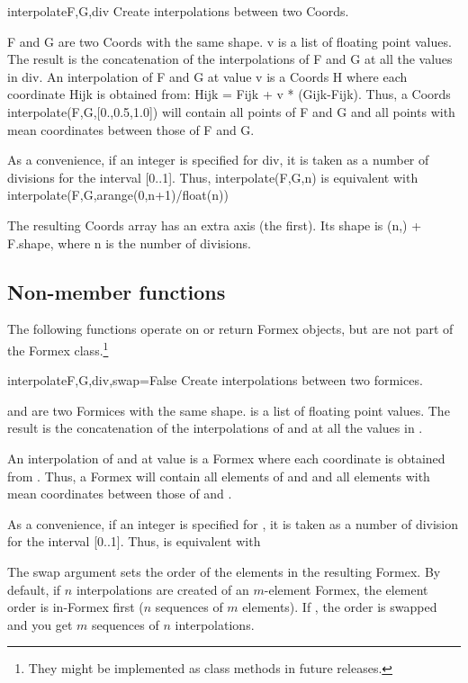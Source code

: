 \begin{methoddesc}{interpolate}{F,G,div}
Create interpolations between two Coords.

        F and G are two Coords with the same shape.
        v is a list of floating point values.
        The result is the concatenation of the interpolations of F and G at all
        the values in div.
        An interpolation of F and G at value v is a Coords H where each
        coordinate Hijk is obtained from:  Hijk = Fijk + v * (Gijk-Fijk).
        Thus, a Coords interpolate(F,G,[0.,0.5,1.0]) will contain all points of
        F and G and all points with mean coordinates between those of F and G.

        As a convenience, if an integer is specified for div, it is taken as a
        number of divisions for the interval [0..1].
        Thus, interpolate(F,G,n) is equivalent with
        interpolate(F,G,arange(0,n+1)/float(n))

        The resulting Coords array has an extra axis (the first). Its shape is
        (n,) + F.shape, where n is the number of divisions.

\classmethod
\end{methoddesc}



\subsection{Non-member functions}
The following functions operate on or return Formex objects, but are not part of the Formex class.\footnote{They might be implemented as class methods in future releases.}


\begin{funcdesc}{interpolate}{F,G,div,swap=False}
Create interpolations between two formices.

 and  are two Formices with the same shape.
 is a list of floating point values.
The result is the concatenation of the interpolations of  and  at all the values in .

An interpolation of  and  at value  is a Formex  where each coordinate  is obtained from  .
Thus, a Formex  will contain all elements
of  and  and all elements with mean coordinates between those of  and .

As a convenience, if an integer is specified for , it is taken as a
number of division for the interval [0..1].
Thus,  is equivalent with

The swap argument sets the order of the elements in the resulting Formex.
By default, if $n$ interpolations are created of an $m$-element Formex, the element order is in-Formex first ($n$ sequences of $m$ elements).
If , the order is swapped and you get $m$ sequences of $n$
interpolations.
\end{funcdesc}




